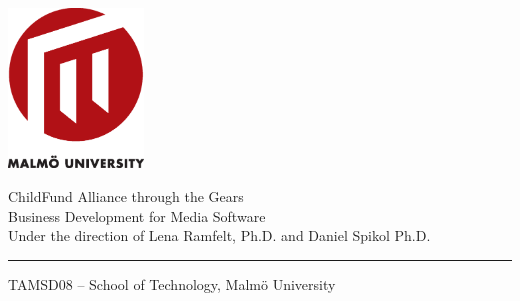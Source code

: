 \begin{titlepage}
\begin{flushright}
\includegraphics[width=36mm]{images/logo}
\end{flushright}

\begin{flushleft}

\vspace{15mm}
\Huge ChildFund Alliance through the Gears \\
\renewcommand{\baselinestretch}{0.98}
\Large Business Development for Media Software \\ Under the direction of
Lena Ramfelt, Ph.D. and Daniel Spikol Ph.D. 
\vspace{10mm}
\rule{0.95\textwidth}{0.4pt}
\vspace{10mm}


\Large
\vspace{05mm}
TAMSD08 – School of Technology, Malmö University

\renewcommand{\baselinestretch}{1.0}\normalsize
\end{flushleft}
\end{titlepage}